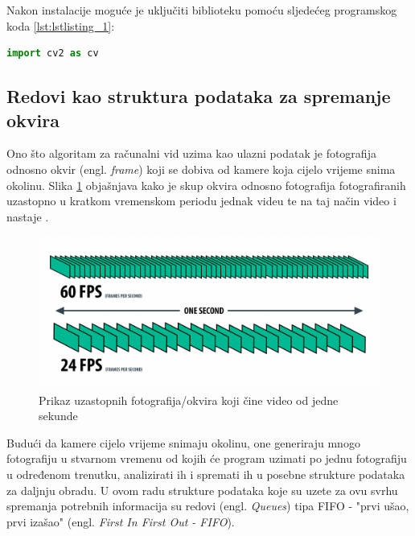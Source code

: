 \documentclass{foi}
\begin{document}
\flushleft Nakon instalacije moguće je uključiti biblioteku pomoću sljedećeg programskog koda \ref{lst:lstlisting_1}:
\justifying
\begin{lstlisting}[language=Python, label={lst:lstlisting_1}, firstnumber=1, style=colored, caption=Uključivanje biblioteke $OpenCV$]
import cv2 as cv
\end{lstlisting}

\justifying

\subsection{Redovi kao struktura podataka za spremanje okvira}

Ono što algoritam za računalni vid uzima kao ulazni podatak je fotografija odnosno okvir (engl. \emph{frame}) koji se dobiva od kamere koja cijelo vrijeme snima okolinu. Slika \ref{fig:slika_frame} objašnjava kako je skup okvira odnosno fotografija fotografiranih uzastopno u kratkom vremenskom periodu jednak videu te na taj način video i nastaje \cite{AnimoticaBlog2020}.

\begin{figure}[h!]
    \centering
    \includegraphics[width=1\textwidth]{slike/frames-per-second-diagram}
    \caption{Prikaz uzastopnih fotografija/okvira koji čine video od jedne sekunde \cite{AnimoticaBlog2020}}
    \label{fig:slika_frame}
\end{figure}

Budući da kamere cijelo vrijeme snimaju okolinu, one generiraju mnogo fotografiju u stvarnom vremenu od kojih će program uzimati po jednu fotografiju u određenom trenutku, analizirati ih i spremati ih u posebne strukture podataka za daljnju obradu. U ovom radu strukture podataka koje su uzete za ovu svrhu spremanja potrebnih informacija su redovi (engl. \emph{Queues}) tipa FIFO - "prvi ušao, prvi izašao" (engl. \emph{First In First Out - FIFO}).
\end{document}
